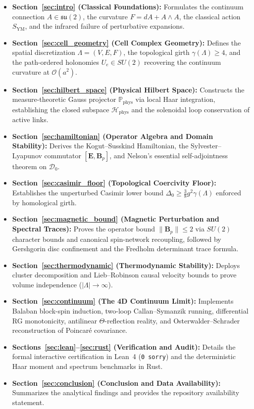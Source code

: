 \documentclass[11pt,reqno]{article}
\begin{document}
\begin{itemize}
    \item \textbf{Section~\ref{sec:intro} (Classical Foundations):} Formulates the continuum connection $A \in \mathfrak{su}(2)$, the curvature $F = dA + A \wedge A$, the classical action $S_{\mathrm{YM}}$, and the infrared failure of perturbative expansions.
    \item \textbf{Section~\ref{sec:cell_geometry} (Cell Complex Geometry):} Defines the spatial discretization $\Lambda = (V, E, F)$, the topological girth $\gamma(\Lambda) \ge 4$, and the path-ordered holonomies $U_e \in SU(2)$ recovering the continuum curvature at $\mathcal{O}(a^2)$.
    \item \textbf{Section~\ref{sec:hilbert_space} (Physical Hilbert Space):} Constructs the measure-theoretic Gauss projector $\mathbb{P}_{\mathrm{phys}}$ via local Haar integration, establishing the closed subspace $\mathcal{H}_{\mathrm{phys}}$ and the solenoidal loop conservation of active links.
    \item \textbf{Section~\ref{sec:hamiltonian} (Operator Algebra and Domain Stability):} Derives the Kogut--Susskind Hamiltonian, the Sylvester--Lyapunov commutator $[\mathbf{E}, \mathbf{B}_p]$, and Nelson's essential self-adjointness theorem on $\mathcal{D}_0$.
    \item \textbf{Section~\ref{sec:casimir_floor} (Topological Coercivity Floor):} Establishes the unperturbed Casimir lower bound $\Delta_0 \ge \frac{3}{8}g^2\gamma(\Lambda)$ enforced by homological girth.
    \item \textbf{Section~\ref{sec:magnetic_bound} (Magnetic Perturbation and Spectral Traces):} Proves the operator bound $\|\mathbf{B}_p\| \le 2$ via $SU(2)$ character bounds and canonical spin-network recoupling, followed by Gershgorin disc confinement and the Fredholm determinant trace formula.
    \item \textbf{Section~\ref{sec:thermodynamic} (Thermodynamic Stability):} Deploys cluster decomposition and Lieb--Robinson causal velocity bounds to prove volume independence ($|\Lambda| \to \infty$).
    \item \textbf{Section~\ref{sec:continuum} (The 4D Continuum Limit):} Implements Balaban block-spin induction, two-loop Callan--Symanzik running, differential RG monotonicity, antilinear $\Theta$-reflection reality, and Osterwalder--Schrader reconstruction of Poincaré covariance.
    \item \textbf{Sections~\ref{sec:lean}--\ref{sec:rust} (Verification and Audit):} Details the formal interactive certification in Lean~4 (\texttt{0 sorry}) and the deterministic Haar moment and spectrum benchmarks in Rust.
    \item \textbf{Section~\ref{sec:conclusion} (Conclusion and Data Availability):} Summarizes the analytical findings and provides the repository availability statement.
\end{itemize}
\end{document}
